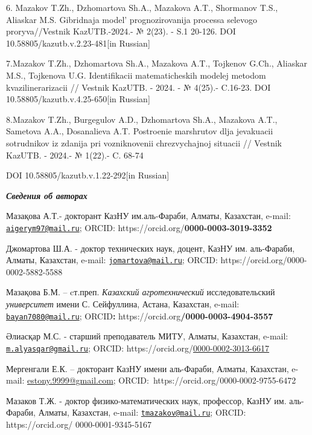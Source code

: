 {6. Mazakov T.Zh., Dzhomartova Sh.A., Mazakova A.T., Shormanov T.S.,
Aliaskar M.S. Gibridnaja model'{} prognozirovanija
processa selevogo proryva//Vestnik KazUTB.-2024.- № 2(23). - S.1 20-126.
DOI 10.58805/kazutb.v.2.23-481{[}in Russian{]}

7.Mazakov T.Zh., Dzhomartova Sh.A., Mazakova A.T., Tojkenov G.Ch.,
Aliaskar M.S., Tojkenova U.G. Identifikacii matematicheskih modelej
metodom kvazilinerarizacii // Vestnik KazUTB. - 2024. - № 4(25).-
C.16-23. DOI 10.58805/kazutb.v.4.25-650{[}in Russian{]}

8.Mazakov T.Zh., Burgegulov A.D., Dzhomartova Sh.A., Mazakova A.T.,
Sametova A.A., Dosanalieva A.T. Postroenie marshrutov dlja jevakuacii
sotrudnikov iz zdanija pri vozniknovenii chrezvychajnoj situacii //
Vestnik KazUTB. - 2024.- № 1(22).- C. 68-74

DOI 10.58805/kazutb.v.1.22-292{[}in Russian{]}

\emph{{\bfseries Сведения об авторах}}

Мазақова А.Т.- докторант КазНУ им.аль-Фараби, Алматы, Казахстан, e-mail:
\href{mailto:aigerym97@mail.ru}{\nolinkurl{aigerym97@mail.ru}}; ORCID:
https://orcid.org/{\bfseries 0000-0003-3019-3352}

Джомартова Ш.А. - доктор технических наук, доцент, КазНУ им. аль-Фараби,
Алматы, Казахстан, e-mail:
\href{mailto:jomartova@mail.ru}{\nolinkurl{jomartova@mail.ru}}; ORCID:
https://orcid.org/0000-0002-5882-5588

Мазақова Б.М. -- cт.преп. \emph{Казахский агротехнический}
исследовательский \emph{университет} имени С. Сейфуллина, Астана,
Казахстан, e-mail:
\href{mailto:bayan7080@mail.ru}{\nolinkurl{bayan7080@mail.ru}};
ORCID{\bfseries :} https://orcid.org{\bfseries /0000-0003-4904-3557}

Әлиасқар М.С. - старший преподаватель МИТУ, Алматы, Казахстан, e-mail:
\href{mailto:m.alyasqar@gmail.ru}{\nolinkurl{m.alyasqar@gmail.ru}};
ORCID:
https://orcid.org/\href{https://orcid.org/0000-0002-3013-6617}{0000-0002-3013-6617}

Мергенгали Е.К. -- докторант КазНУ имени аль-Фараби, Алматы, Казахстан,
e-mail:
\href{https://e.mail.ru/compose/?mailto=mailto\%3aestony.9999@gmail.com}{estony.9999@gmail.com};
ORCID:~https://orcid.org/0000-0002-9755-6472

Мазаков Т.Ж. - доктор физико-математических наук, профессор, КазНУ им.
аль-Фараби, Алматы, Казахстан, e-mail:
\href{mailto:tmazakov@mail.ru}{\nolinkurl{tmazakov@mail.ru}}; ORCID:
https://orcid.org/ 0000-0001-9345-5167

}
